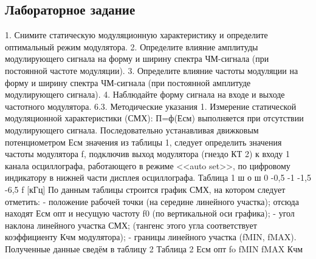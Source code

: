 ﻿\documentclass[a4paper,12pt]{article}
\begin{document}
\subsection{Лабораторное задание}
1.	Снимите статическую модуляционную характеристику и определите оптимальный режим модулятора.
2.	Определите влияние амплитуды модулирующего сигнала на форму и ширину спектра ЧМ-сигнала (при постоянной частоте модуляции).
3.	Определите влияние частоты модуляции на форму и ширину спектра ЧМ-сигнала (при постоянной амплитуде модулирующего сигнала).
4.	Наблюдайте форму сигнала на входе и выходе частотного модулятора.
6.3.	Методические указания
1.	Измерение статической модуляционной характеристики (СМХ): П=ф(Есм) выполняется при отсутствии модулирующего сигнала. Последовательно устанавливая движковым потенциометром Есм значения из таблицы 1, следует определить значения частоты модулятора f, подключив выход модулятора (гнездо КТ 2) к входу 1 канала осциллографа, работающего в режиме <<auto set>>, по цифровому индикатору в нижней части дисплея осциллографа.
Таблица 1
ш о ш	0	-0,5	-1	-1,5		-6,5
f [кГц]						
По данным таблицы строится график СМХ, на котором следует отметить:
-	положение рабочей точки (на середине линейного участка);
отсюда находят Есм опт и несущую частоту f0 (по вертикальной оси графика);
-	угол наклона линейного участка СМХ;
(тангенс этого угла соответствует коэффициенту Кчм модулятора);
-	границы линейного участка (fMIN, fMAX).
Полученные данные сведём в таблицу 2
Таблица 2
Есм опт	fo	fMIN	fMAX	Кчм
				
\end{document}

